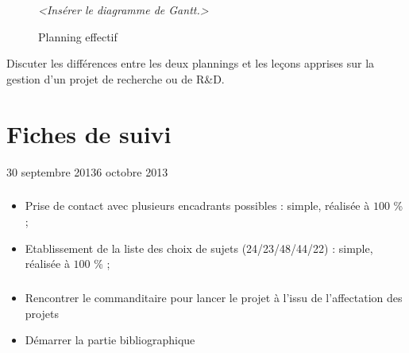 \documentclass[11pt, french]{report-rd-info}
\begin{document}
\begin{figure}
	\centering
		\emph{<Insérer le diagramme de Gantt.>}
	\caption{Planning effectif}
	\label{fig:PlanningEffectif}
\end{figure}

Discuter les différences entre les deux plannings et les leçons apprises sur la gestion d'un projet de recherche ou de R\&D.

\chapter{Fiches de suivi}
\label{ann:FichesSuivi}

\begin{fichesuivi}{30 septembre 2013}{6 octobre 2013}

\paragraph{}
	\begin{travaileffectue}
		\begin{itemize}
			\item Prise de contact avec plusieurs encadrants possibles : simple, réalisée à $100$ \% ;
			\item Etablissement de la liste des choix de sujets (24/23/48/44/22) : simple, réalisée à $100$ \% ;		
		\end{itemize}
	\end{travaileffectue}
	
\paragraph{}
	\begin{planification}
		\begin{itemize}
			\item Rencontrer le commanditaire pour lancer le projet à l'issu de l'affectation des projets
			\item Démarrer la partie bibliographique
		\end{itemize}
	\end{planification}
\end{fichesuivi}
\end{document}
